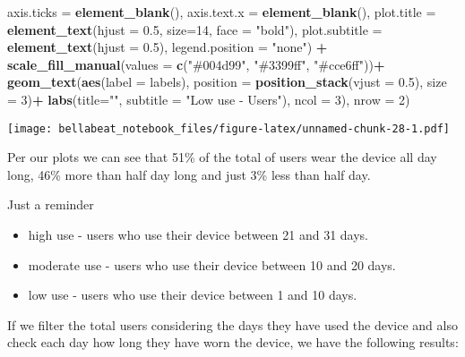 \documentclass[
]{article}
\newenvironment{Shaded}{\begin{snugshade}}{\end{snugshade}}
\newcommand{\AttributeTok}[1]{\textcolor[rgb]{0.13,0.29,0.53}{#1}}
\newcommand{\DecValTok}[1]{\textcolor[rgb]{0.00,0.00,0.81}{#1}}
\newcommand{\FloatTok}[1]{\textcolor[rgb]{0.00,0.00,0.81}{#1}}
\newcommand{\FunctionTok}[1]{\textcolor[rgb]{0.13,0.29,0.53}{\textbf{#1}}}
\newcommand{\NormalTok}[1]{#1}
\newcommand{\SpecialCharTok}[1]{\textcolor[rgb]{0.81,0.36,0.00}{\textbf{#1}}}
\newcommand{\StringTok}[1]{\textcolor[rgb]{0.31,0.60,0.02}{#1}}
\providecommand{\tightlist}{%
  \setlength{\itemsep}{0pt}\setlength{\parskip}{0pt}}
\begin{document}
\begin{Shaded}
\begin{Highlighting}[]
        \AttributeTok{axis.ticks =} \FunctionTok{element\_blank}\NormalTok{(),}
        \AttributeTok{axis.text.x =} \FunctionTok{element\_blank}\NormalTok{(),}
        \AttributeTok{plot.title =} \FunctionTok{element\_text}\NormalTok{(}\AttributeTok{hjust =} \FloatTok{0.5}\NormalTok{, }\AttributeTok{size=}\DecValTok{14}\NormalTok{, }\AttributeTok{face =} \StringTok{"bold"}\NormalTok{), }
        \AttributeTok{plot.subtitle =} \FunctionTok{element\_text}\NormalTok{(}\AttributeTok{hjust =} \FloatTok{0.5}\NormalTok{),}
        \AttributeTok{legend.position =} \StringTok{"none"}\NormalTok{) }\SpecialCharTok{+}
    \FunctionTok{scale\_fill\_manual}\NormalTok{(}\AttributeTok{values =} \FunctionTok{c}\NormalTok{(}\StringTok{"\#004d99"}\NormalTok{, }\StringTok{"\#3399ff"}\NormalTok{, }\StringTok{"\#cce6ff"}\NormalTok{))}\SpecialCharTok{+}
  \FunctionTok{geom\_text}\NormalTok{(}\FunctionTok{aes}\NormalTok{(}\AttributeTok{label =}\NormalTok{ labels),}
            \AttributeTok{position =} \FunctionTok{position\_stack}\NormalTok{(}\AttributeTok{vjust =} \FloatTok{0.5}\NormalTok{), }\AttributeTok{size =} \DecValTok{3}\NormalTok{)}\SpecialCharTok{+}
  \FunctionTok{labs}\NormalTok{(}\AttributeTok{title=}\StringTok{""}\NormalTok{, }\AttributeTok{subtitle =} \StringTok{"Low use {-} Users"}\NormalTok{), }
  \AttributeTok{ncol =} \DecValTok{3}\NormalTok{),}
  \AttributeTok{nrow =} \DecValTok{2}\NormalTok{)}
\end{Highlighting}
\end{Shaded}

\texttt{[image: bellabeat\_notebook\_files/figure-latex/unnamed-chunk-28-1.pdf]}

Per our plots we can see that 51\% of the total of users wear the device
all day long, 46\% more than half day long and just 3\% less than half
day.

Just a reminder

\begin{itemize}
\tightlist
\item
  high use - users who use their device between 21 and 31 days.
\item
  moderate use - users who use their device between 10 and 20 days.
\item
  low use - users who use their device between 1 and 10 days.
\end{itemize}

If we filter the total users considering the days they have used the
device and also check each day how long they have worn the device, we
have the following results:
\end{document}
